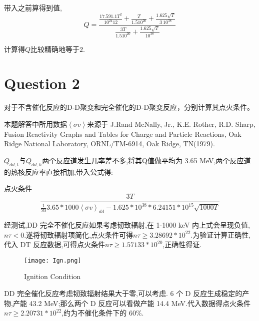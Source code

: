 \documentclass[UTF8, 10pt]{article}
\begin{document}
带入之前算得到值,
\begin{equation}
    Q=\frac{\frac{17.59 1.1 T^2}{10^{24} 12}+\frac{T}{1.5 10^{20}}+\frac{1.625 \sqrt{T}}{3\ 10^{38}}}{\frac{3 T}{1.5 10^{20}}+\frac{1.625 \sqrt{T}}{10^{38}}}
\end{equation}

计算得$Q比较精确地等于2$.
\section*{Question 2}
对于不含催化反应的D-D聚变和完全催化的D-D聚变反应，分别计算其点火条件。


本题解答中所用数据$\left \langle \sigma v \right \rangle$来源于 J.Rand McNally, Jr., K.E. Rother, R.D. Sharp, Fusion Reactivity Graphs and Tables for Charge and Particle Reactions, Oak Ridge National Laboratory, ORNL/TM-6914, Oak Ridge, TN(1979).

$Q_{dd,t}$与$Q_{dd,h}$两个反应道发生几率差不多,将其Q值做平均为 3.65 MeV,两个反应道的热核反应率直接相加,带入公式得:

点火条件
\begin{equation}
    \frac{3 T}{\frac{1}{20} 3.65* 1000 \left \langle \sigma v \right \rangle_{dd}-1.625*10^{38}* 6.24151* 10^{15} \sqrt{1000 T}}
\end{equation}

经测试,DD 完全不催化反应如果考虑韧致辐射,在 1-1000 keV 内上式会呈现负值,$n\tau<0$.遂将韧致辐射项简化,点火条件可得$n\tau \geq 3.28692*10^{22}$.为验证计算正确性,代入 DT 反应数据,可得点火条件$n\tau \geq 1.57133*10^{20}$,正确性得证.

\begin{figure}[!htbp]
	\begin{center}
		\texttt{[image: Ign.png]}
		\caption{Ignition Condition}
	\end{center}
	\vspace{-0.5em}
\end{figure}


DD 完全催化反应考虑韧致辐射结果大于零,可以考虑. 6 个 D 反应生成稳定的产物,产能 43.2 MeV;那么两个 D 反应可以看做产能 14.4 MeV.代入数据得点火条件$n\tau \geq 2.20731*10^{22}$,约为不催化条件下的 $60\%$.
\end{document}
